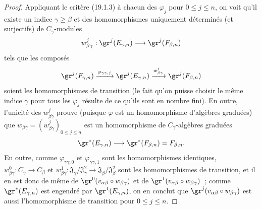 \begin{proof}
Appliquant le critère (19.1.3) à chacun des $\varphi_j$ pour $0\leq j\leq n$,
on voit qu'il existe un indice $\gamma\geq\beta$ et des homomorphismes
uniquement déterminés (et surjectifs) de $C_\gamma$-modules
\[
  w_{\beta\gamma}^j:\gr^j(E_{\gamma,n})\longrightarrow
  \gr^j(F_{\beta,n})
\]
tels que les composés
\[
  \gr^j(F_{\gamma,n})
  \xrightarrow{\varphi_{\gamma\gamma,j}}\gr^j(E_{\gamma,n})
  \xrightarrow{w_{\beta\gamma}^j}\gr^j(F_{\beta,n})
\]
soient les homomorphismes de transition (le fait qu'on puisse choisir le même
indice $\gamma$ pour tous les $\varphi_j$ résulte de ce qu'ils sont en nombre
fini). En outre, l'unicité des $w_{\beta\gamma}^j$ prouve (puisque $\varphi$ est
un homomorphisme d'algèbres graduées) que
$w_{\beta\gamma}=(w_{\beta\gamma}^j)_{0\leq j\leq n}$ est un homomorphisme de
$C_\gamma$-algèbres graduées
\[
  \gr^*(E_{\gamma,n})\longrightarrow
  \gr^*(F_{\beta,n})=F_{\beta,n}.
\]
En outre, comme $\varphi_{\gamma\gamma,0}$ et $\varphi_{\gamma\gamma,1}$ sont
les homomorphismes identiques,
$w_{\beta\gamma}^0:C_\gamma\to C_\beta$ et
$w_{\beta\gamma}^1:\mathfrak J_\gamma/\mathfrak J_\gamma^2
\to\mathfrak J_\beta/\mathfrak J_\beta^2$ sont les homomorphismes de
transition, et il en est donc de même de
$\gr^0(v_{\alpha\beta}\circ w_{\beta\gamma})$ et de
$\gr^1(v_{\alpha\beta}\circ w_{\beta\gamma})$~; comme
$\gr^*(E_{\gamma,n})$ est engendré par $\gr^1(E_{\gamma,n})$, on en conclut que
$\gr^j(v_{\alpha\beta}\circ w_{\beta\gamma})$ est aussi l'homomorphisme de
transition pour $0\leq j\leq n$.


\end{proof}
